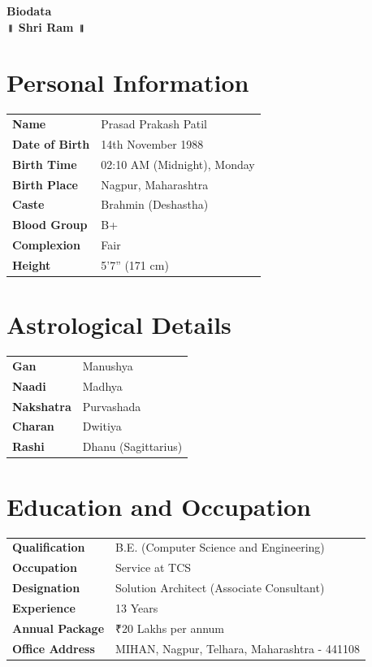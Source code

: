 \documentclass[10pt,a4paper,twocolumn]{article}
\begin{document}
\begin{center}
    {\Large \textbf{Biodata}}\\
    \textbf{॥ Shri Ram ॥}
\end{center}

\vspace{0.5em}

\section*{Personal Information}
\begin{tabularx}{\linewidth}{lX}
\textbf{Name} & Prasad Prakash Patil \\
\textbf{Date of Birth} & 14th November 1988 \\
\textbf{Birth Time} & 02:10 AM (Midnight), Monday \\
\textbf{Birth Place} & Nagpur, Maharashtra \\
\textbf{Caste} & Brahmin (Deshastha) \\
\textbf{Blood Group} & B+ \\
\textbf{Complexion} & Fair \\
\textbf{Height} & 5'7'' (171 cm) \\
\end{tabularx}

\section*{Astrological Details}
\begin{tabularx}{\linewidth}{lX}
\textbf{Gan} & Manushya \\
\textbf{Naadi} & Madhya \\
\textbf{Nakshatra} & Purvashada \\
\textbf{Charan} & Dwitiya \\
\textbf{Rashi} & Dhanu (Sagittarius) \\
\end{tabularx}

\section*{Education and Occupation}
\begin{tabularx}{\linewidth}{lX}
\textbf{Qualification} & B.E. (Computer Science and Engineering) \\
\textbf{Occupation} & Service at TCS \\
\textbf{Designation} & Solution Architect (Associate Consultant) \\
\textbf{Experience} & 13 Years \\
\textbf{Annual Package} & ₹20 Lakhs per annum \\
\textbf{Office Address} & MIHAN, Nagpur, Telhara, Maharashtra - 441108 \\
\end{tabularx}
\end{document}
